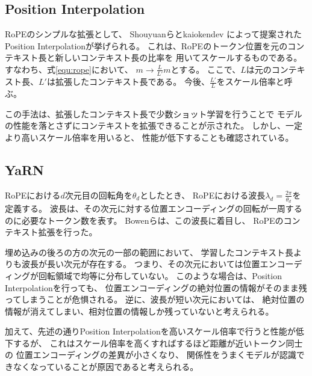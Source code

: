 \documentclass{jsarticle}
\begin{document}
    \subsection{Position Interpolation}
        RoPEのシンプルな拡張として、
        Shouyuanら\cite{inter}とkaiokendev\cite{kaiokendev}
        によって提案されたPosition Interpolationが挙げられる。
        これは、RoPEのトークン位置を元のコンテキスト長と新しいコンテキスト長の比率を
        用いてスケールするものである。
        すなわち、式\ref{equ:rope}において、
        $m\rightarrow \frac{L}{L'}m$とする。
        ここで、$L$は元のコンテキスト長、$L'$は拡張したコンテキスト長である。
        今後、$\frac{L'}{L}$をスケール倍率と呼ぶ。
        
        この手法は、拡張したコンテキスト長で少数ショット学習を行うことで
        モデルの性能を落とさずにコンテキストを拡張できることが示された\cite{inter}。
        しかし、一定より高いスケール倍率を用いると、
        性能が低下することも確認されている。

    \subsection{YaRN}
        RoPEにおける$d$次元目の回転角を$\theta_d$としたとき、
        RoPEにおける波長$\lambda_d=\frac{2\pi}{\theta_d}$を定義する。
        波長は、その次元に対する位置エンコーディングの回転が一周するのに必要なトークン数を表す。
        Bowenら\cite{yarn}は、この波長に着目し、
        RoPEのコンテキスト拡張を行った。

        埋め込みの後ろの方の次元の一部の範囲において、
        学習したコンテキスト長よりも波長が長い次元が存在する。
        つまり、その次元においては位置エンコーディングが回転領域で均等に分布していない。
        このような場合は、Position Interpolationを行っても、
        位置エンコーディングの絶対位置の情報がそのまま残ってしまうことが危惧される。
        逆に、波長が短い次元においては、
        絶対位置の情報が消えてしまい、相対位置の情報しか残っていないと考えられる。

        加えて、先述の通りPosition Interpolationを高いスケール倍率で行うと性能が低下するが、
        これはスケール倍率を高くすればするほど距離が近いトークン同士の
        位置エンコーディングの差異が小さくなり、
        関係性をうまくモデルが認識できなくなっていることが原因であると考えられる。
\end{document}

